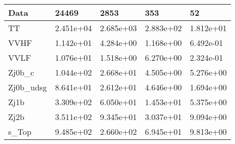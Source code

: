 \begin{table}
{\begin{tabularx}{\textwidth}{|X|X|X|X|X|}
\hline
Data & 24469 & 2853 & 353 & 52 \\
\hline
TT & 2.451e+04 & 2.685e+03 & 2.883e+02 & 1.812e+01 \\
VVHF & 1.142e+01 & 4.284e+00 & 1.168e+00 & 6.492e-01 \\
VVLF & 1.076e+01 & 1.518e+00 & 6.270e+00 & 2.324e-01 \\
Zj0b\_c & 1.044e+02 & 2.668e+01 & 4.505e+00 & 5.276e+00 \\
Zj0b\_udsg & 8.641e+01 & 2.612e+01 & 4.646e+00 & 1.694e+00 \\
Zj1b & 3.309e+02 & 6.050e+01 & 1.453e+01 & 5.375e+00 \\
Zj2b & 3.511e+02 & 9.345e+01 & 3.037e+01 & 9.094e+00 \\
s\_Top & 9.485e+02 & 2.660e+02 & 6.945e+01 & 9.813e+00 \\
\hline
\end{tabularx}
}
\label{tab:cr-Zee-2018}
\end{table}

